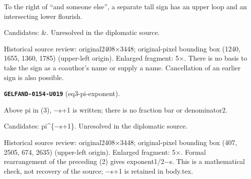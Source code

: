 To the right of “and someone else”, a separate tall sign has an upper loop and an intersecting lower flourish.\par
Candidates: \&. Unresolved in the diplomatic source.\par
Historical source review: original2408×3448; original-pixel bounding box (1240, 1655, 1360, 1785) (upper-left origin). Enlarged fragment: 5×. There is no basis to take the sign as a coauthor’s name or supply a name. Cancellation of an earlier sign is also possible.\par\medskip
\par\noindent\leavevmode{}\label{GELFAND-0154-U019}\textbf{\texttt{GELFAND-0154-U019}} (eq3-pi-exponent).\nopagebreak[4]\par
Above pi in (3), −s+1 is written; there is no fraction bar or denominator2.\par
Candidates: pi\textasciicircum{}\{−s+1\}. Unresolved in the diplomatic source.\par
Historical source review: original2408×3448; original-pixel bounding box (407, 2505, 674, 2635) (upper-left origin). Enlarged fragment: 5×. Formal rearrangement of the preceding (2) gives exponent1/2−s. This is a mathematical check, not recovery of the source; −s+1 is retained in body.tex.\par\medskip

